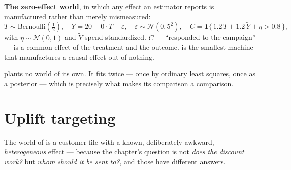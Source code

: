 \textbf{The zero-effect world}, in which any effect an estimator reports is manufactured rather
than merely mismeasured:
%
\begin{equation}
  T \sim \text{Bernoulli}(\tfrac12), \quad
  Y = 20 + 0 \cdot T + \varepsilon, \quad \varepsilon \sim \mathcal N(0, 5^2), \quad
  C = \mathbf 1\big\{\,1.2\,T + 1.2\,\tilde Y + \eta > 0.8\,\big\},
  \label{eq:app:fnd_collider}
\end{equation}
%
with $\eta \sim \mathcal N(0,1)$ and $\tilde Y$ spend standardized. $C$ --- ``responded to the
campaign'' --- is a common effect of the treatment and the outcome.  is
the smallest machine that manufactures a causal effect out of nothing.

\begin{remark}
 plants no world of its own. It fits 
twice --- once by ordinary least squares, once as a posterior --- which is precisely what makes its
comparison a comparison.
\end{remark}

\section{Uplift targeting}
\label{app:dgp:uplift}

The world of  is a customer file with a known, deliberately awkward,
\emph{heterogeneous} effect --- because the chapter's question is not \emph{does the discount
work?} but \emph{whom should it be sent to?}, and those have different answers.

